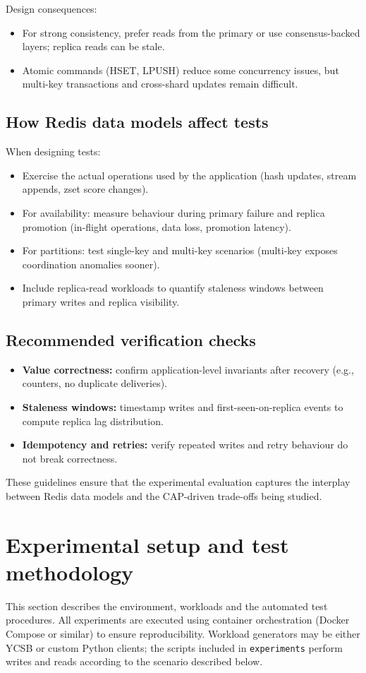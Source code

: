 \documentclass{article}
\begin{document}
Design consequences:
\begin{itemize}
    \item For strong consistency, prefer reads from the primary or use consensus-backed layers; replica reads can be stale.
    \item Atomic commands (HSET, LPUSH) reduce some concurrency issues, but multi-key transactions and cross-shard updates remain difficult.
\end{itemize}

\subsection{How Redis data models affect tests}
When designing tests:
\begin{itemize}
    \item Exercise the actual operations used by the application (hash updates, stream appends, zset score changes).
    \item For availability: measure behaviour during primary failure and replica promotion (in-flight operations, data loss, promotion latency).
    \item For partitions: test single-key and multi-key scenarios (multi-key exposes coordination anomalies sooner).
    \item Include replica-read workloads to quantify staleness windows between primary writes and replica visibility.
\end{itemize}

\subsection{Recommended verification checks}
\begin{itemize}
    \item \textbf{Value correctness:} confirm application-level invariants after recovery (e.g., counters, no duplicate deliveries).
    \item \textbf{Staleness windows:} timestamp writes and first-seen-on-replica events to compute replica lag distribution.
    \item \textbf{Idempotency and retries:} verify repeated writes and retry behaviour do not break correctness.
\end{itemize}

These guidelines ensure that the experimental evaluation captures the interplay between Redis data models and the CAP-driven trade-offs being studied.

\section{Experimental setup and test methodology}
This section describes the environment, workloads and the automated test %
procedures. All experiments are executed using container orchestration %
(Docker Compose or similar) to ensure reproducibility. Workload generators %
may be either YCSB or custom Python clients; the scripts included in %
\texttt{experiments} perform writes and reads according to the scenario described below.
\end{document}
